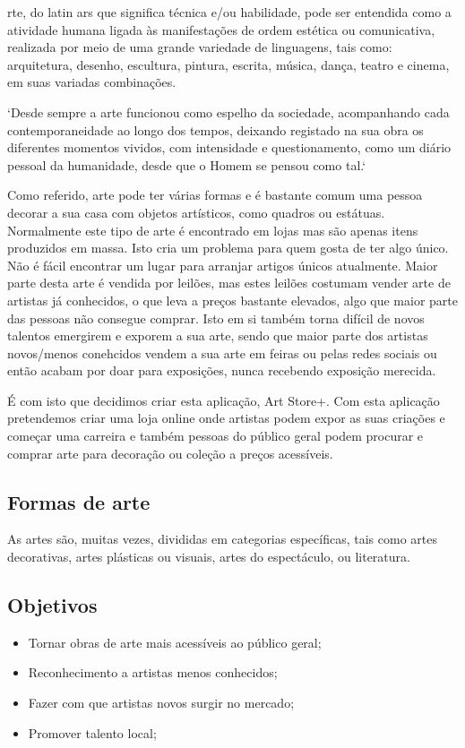 \documentclass[conference]{IEEEtran}
\begin{document}
rte, do latin ars que significa técnica e/ou habilidade, pode ser entendida 
como a atividade humana ligada às manifestações de ordem estética ou comunicativa, realizada 
por meio de uma grande variedade de linguagens, tais como: arquitetura, desenho, escultura, 
pintura, escrita, música, dança, teatro e cinema, em suas variadas combinações. \cite{wikiarte}

`Desde sempre a arte funcionou como espelho da sociedade, 
acompanhando cada contemporaneidade ao longo dos tempos, deixando registado na sua obra os diferentes 
momentos vividos, com intensidade e questionamento, como um diário pessoal da humanidade, 
desde que o Homem se pensou como tal.` \cite{patrimonio}

Como referido, arte pode ter várias formas e é bastante comum uma pessoa decorar a sua casa com objetos artísticos, como quadros ou estátuas. Normalmente este tipo de arte é encontrado em lojas mas são apenas itens produzidos em massa. Isto cria um problema para quem gosta de ter algo único. Não é fácil encontrar um lugar para arranjar artigos únicos atualmente. Maior parte desta arte é vendida por leilões, mas estes leilões costumam vender arte de artistas já conhecidos, o que leva a preços bastante elevados, algo que maior parte das pessoas não consegue comprar. Isto em si também torna difícil de novos talentos emergirem e exporem a sua arte, sendo que maior parte dos artistas novos/menos conehcidos vendem a sua arte em feiras ou pelas redes sociais ou então acabam por doar para exposições, nunca recebendo exposição merecida.

É com isto que decidimos criar esta aplicação, Art Store+. Com esta aplicação pretendemos criar uma loja online onde artistas podem expor as suas criações e começar uma carreira e também pessoas do público geral podem procurar e comprar arte para decoração ou coleção a preços acessíveis.


\subsection{Formas de arte}
As artes são, muitas vezes, divididas em categorias específicas, tais como artes decorativas, 
artes plásticas ou visuais, artes do espectáculo, ou literatura.

\subsection{Objetivos}
\begin{itemize}
    \item Tornar obras de arte mais acessíveis ao público geral;
    \item Reconhecimento a artistas menos conhecidos;
    \item Fazer com que artistas novos surgir no mercado;
    \item Promover talento local;
\end{itemize}
\end{document}
